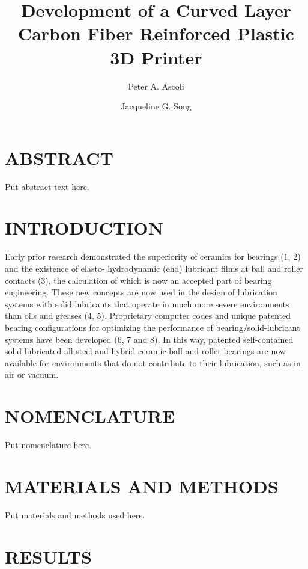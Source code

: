 \documentclass[twocolumn,10pt]{asme2e}
\title{Development of a Curved Layer Carbon Fiber Reinforced Plastic 3D Printer}
\author{Peter A. Ascoli
    \affiliation{
	The Cooper Union\\
	New York, NY, USA
    }	
}
\author{Jacqueline G. Song    
    \affiliation{
    The Cooper Union\\
	New York, NY, USA
    }
}
\begin{document}
\maketitle    

\section*{ABSTRACT}

Put abstract text here.

\section*{INTRODUCTION}

Early prior research demonstrated the superiority of ceramics for bearings (1, 2) and the existence of elasto- hydrodynamic (ehd) lubricant films at ball and roller contacts (3), the calculation of which is now an accepted part of bearing engineering.  These new concepts are now used in the design of lubrication systems with solid lubricants that operate in much more severe environments than oils and greases (4, 5).  Proprietary computer codes and unique patented bearing configurations for optimizing the performance of bearing/solid-lubricant systems have been developed (6, 7 and 8).  In this way, patented self-contained solid-lubricated all-steel and hybrid-ceramic ball and roller bearings are now available for environments that do not contribute to their lubrication, such as in air or vacuum.

\section*{NOMENCLATURE}

Put nomenclature here.

\section*{MATERIALS AND METHODS}

Put materials and methods used here.

\section*{RESULTS}
\end{document}
